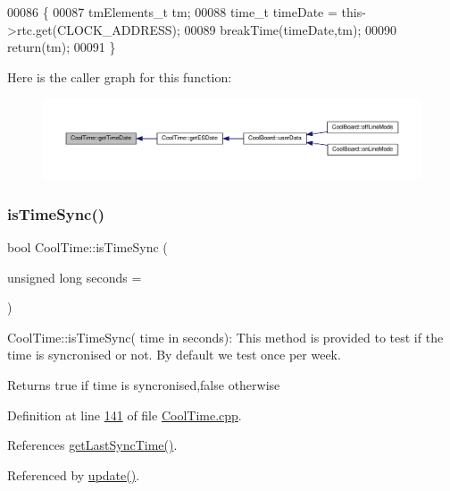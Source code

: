 \begin{DoxyCode}
00086 \{   
00087     tmElements\_t tm;
00088     time\_t timeDate = this->rtc.get(CLOCK\_ADDRESS);
00089     breakTime(timeDate,tm);
00090     \textcolor{keywordflow}{return}(tm);
00091 \}
\end{DoxyCode}
Here is the caller graph for this function\+:
\nopagebreak
\begin{figure}[H]
\begin{center}
\leavevmode
\includegraphics[width=350pt]{class_cool_time_a7a7501c5ca77dd1248bea704c44f986c_icgraph}
\end{center}
\end{figure}
\mbox{\label{class_cool_time_a5ae038a4498602b189f76a10bf02adf8}} 
\subsubsection{\texorpdfstring{is\+Time\+Sync()}{isTimeSync()}}
{\footnotesize\ttfamily bool Cool\+Time\+::is\+Time\+Sync (\begin{DoxyParamCaption}\item[{unsigned long}]{seconds = {} }\end{DoxyParamCaption})}

Cool\+Time\+::is\+Time\+Sync( time in seconds)\+: This method is provided to test if the time is syncronised or not. By default we test once per week.

\begin{DoxyReturn}{Returns}
true if time is syncronised,false otherwise 
\end{DoxyReturn}


Definition at line \hyperlink{_cool_time_8cpp_source_l00141}{141} of file \hyperlink{_cool_time_8cpp_source}{Cool\+Time.\+cpp}.



References \hyperlink{_cool_time_8cpp_source_l00126}{get\+Last\+Sync\+Time()}.



Referenced by \hyperlink{_cool_time_8cpp_source_l00048}{update()}.


